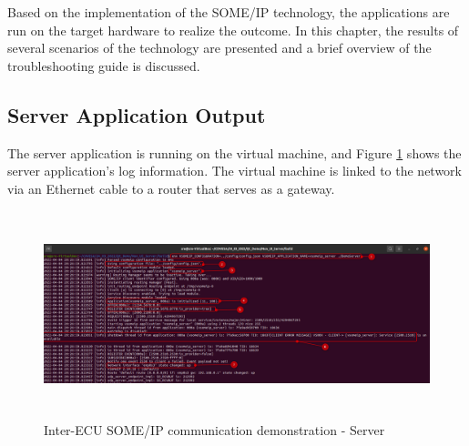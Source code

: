 Based on the implementation of the SOME/IP technology, the applications are run on the target hardware to realize the outcome. In this chapter, the results of several scenarios of the technology are presented and a brief overview of the troubleshooting guide is discussed.

\subsection{Server Application Output}
The server application is running on the virtual machine, and Figure \ref{fig:res_server_eth0} shows the server application's log information. The virtual machine is linked to the network via an Ethernet cable to a router that serves as a gateway.

\begin{figure}[!htb]
	\centering
		\includegraphics[width=1\textwidth, height=6cm, keepaspectratio]{images/res_server_eth0.png}
	\caption{Inter-ECU SOME/IP communication demonstration - Server}
	\label{fig:res_server_eth0}
\end{figure}

